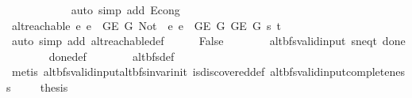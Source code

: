 \begin{isabellebody}
\ \ \ \ \ \ \ \ \ \ \isamarkupfalse%
\ {\isacharparenleft}{\kern0pt}auto\ simp\ add{\isacharcolon}{\kern0pt}\ E{}{\isacharunderscore}{\kern0pt}cong{\isacharparenright}{\kern0pt}\isanewline
\ \ \ \ \ \ \isamarkupfalse%
\isanewline
\ \ \ \ \isamarkupfalse%
\isanewline
\ \ \ \ \isamarkupfalse%
\ {\isachardoublequoteopen}alt{\isacharunderscore}{\kern0pt}reachable\ {\isacharparenleft}{\kern0pt}{\isasymlambda}e{\isachardot}{\kern0pt}\ e\ {\isasymin}\ G{\isachardot}{\kern0pt}E\ {\isacharquery}{\kern0pt}G{}{\isacharparenright}{\kern0pt}\ {\isacharparenleft}{\kern0pt}Not\ {\isasymcirc}\ {\isacharparenleft}{\kern0pt}{\isasymlambda}e{\isachardot}{\kern0pt}\ e\ {\isasymin}\ G{\isachardot}{\kern0pt}E\ {\isacharquery}{\kern0pt}G{}{\isacharparenright}{\kern0pt}{\isacharparenright}{\kern0pt}\ {\isacharparenleft}{\kern0pt}G{\isachardot}{\kern0pt}E\ {\isacharquery}{\kern0pt}G{\isacharparenright}{\kern0pt}\ s\ t{\isachardoublequoteclose}\isanewline
\ \ \ \ \ \ \isamarkupfalse%
\ {\isacharparenleft}{\kern0pt}auto\ simp\ add{\isacharcolon}{\kern0pt}\ alt{\isacharunderscore}{\kern0pt}reachable{\isacharunderscore}{\kern0pt}def{\isacharparenright}{\kern0pt}\isanewline
\ \ \ \ \isamarkupfalse%
\ False\isanewline
\ \ \ \ \ \ \isamarkupfalse%
\ alt{\isacharunderscore}{\kern0pt}bfs{\isacharunderscore}{\kern0pt}valid{\isacharunderscore}{\kern0pt}input\ s{\isacharunderscore}{\kern0pt}neq{\isacharunderscore}{\kern0pt}t\ done{\isacharunderscore}{\kern0pt}{}\isanewline
\ \ \ \ \ \ \isamarkupfalse%
\ done{\isacharunderscore}{\kern0pt}{}{\isacharunderscore}{\kern0pt}def\isanewline
\ \ \ \ \ \ \isamarkupfalse%
\ alt{\isacharunderscore}{\kern0pt}bfs{\isacharunderscore}{\kern0pt}def\isanewline
\ \ \ \ \ \ \isamarkupfalse%
\ {\isacharparenleft}{\kern0pt}metis\ alt{\isacharunderscore}{\kern0pt}bfs{\isacharunderscore}{\kern0pt}valid{\isacharunderscore}{\kern0pt}input{\isachardot}{\kern0pt}alt{\isacharunderscore}{\kern0pt}bfs{\isacharunderscore}{\kern0pt}invar{\isacharunderscore}{\kern0pt}init\ is{\isacharunderscore}{\kern0pt}discovered{\isacharunderscore}{\kern0pt}def\ alt{\isacharunderscore}{\kern0pt}bfs{\isacharunderscore}{\kern0pt}valid{\isacharunderscore}{\kern0pt}input{\isachardot}{\kern0pt}completeness{\isacharparenright}{\kern0pt}\ \isacommand{{\isacharbraceright}{\kern0pt}}\isamarkupfalse%
\isanewline
\ \ \isamarkupfalse%
\ {\isacharquery}{\kern0pt}thesis\isanewline

\end{isabellebody}

